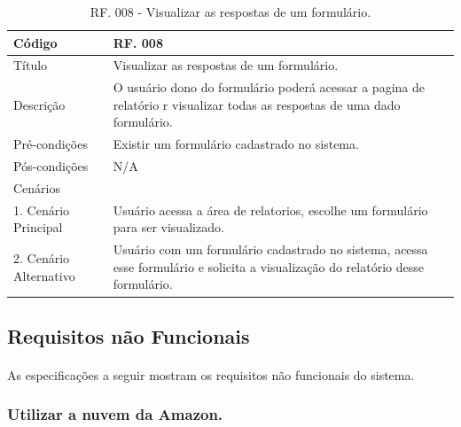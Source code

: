 \documentclass[11pt]{article}
\begin{document}
        \begin{table}[h]
          \begin{center}
            \begin{tabular}{ | p{5cm} | p{10cm} | }
              \hline
              Código\cellcolor{gray} & RF. 008\cellcolor{gray} \\
              \hline
              Título & Visualizar as respostas de um formulário. \\
              \hline
              Descrição & O usuário dono do formulário poderá acessar a pagina de relatório r visualizar todas as respostas de uma dado formulário. \\
              \hline
              Pré-condições & Existir um formulário cadastrado no sistema. \\
              \hline
              Pós-condições & N/A \\
              \hline
              Cenários &   \\
              \hline
              1.  Cenário Principal & Usuário acessa a área de relatorios, escolhe um formulário para ser visualizado. \\
              \hline
              2.  Cenário Alternativo & Usuário com um formulário cadastrado no sistema, acessa esse formulário e solicita a visualização do relatório desse formulário. \\
              \hline
            \end{tabular}
            \caption{RF. 008 - Visualizar as respostas de um formulário.}
          \end{center}
        \end{table}

    \clearpage

    \subsection{Requisitos não Funcionais}
    
      \paragraph{}
      As especificações a seguir mostram os requisitos não funcionais do sistema.

      \subsubsection{Utilizar a nuvem da Amazon.}
\end{document}
